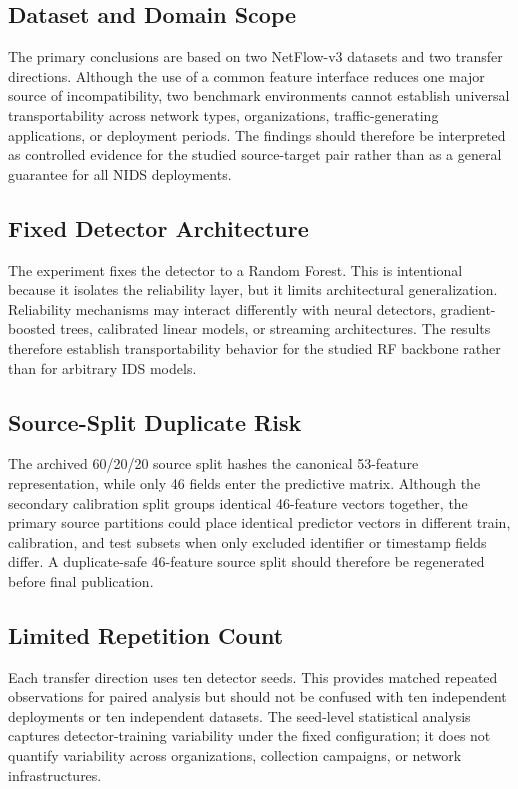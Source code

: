 \documentclass[conference]{IEEEtran}
\begin{document}
\subsection{Dataset and Domain Scope}

The primary conclusions are based on two NetFlow-v3 datasets and two transfer directions. Although the use of a common feature interface reduces one major source of incompatibility, two benchmark environments cannot establish universal transportability across network types, organizations, traffic-generating applications, or deployment periods. The findings should therefore be interpreted as controlled evidence for the studied source-target pair rather than as a general guarantee for all NIDS deployments.

\subsection{Fixed Detector Architecture}

The experiment fixes the detector to a Random Forest. This is intentional because it isolates the reliability layer, but it limits architectural generalization. Reliability mechanisms may interact differently with neural detectors, gradient-boosted trees, calibrated linear models, or streaming architectures. The results therefore establish transportability behavior for the studied RF backbone rather than for arbitrary IDS models.

\subsection{Source-Split Duplicate Risk}

The archived 60/20/20 source split hashes the canonical 53-feature representation, while only 46 fields enter the predictive matrix. Although the secondary calibration split groups identical 46-feature vectors together, the primary source partitions could place identical predictor vectors in different train, calibration, and test subsets when only excluded identifier or timestamp fields differ. A duplicate-safe 46-feature source split should therefore be regenerated before final publication.

\subsection{Limited Repetition Count}

Each transfer direction uses ten detector seeds. This provides matched repeated observations for paired analysis but should not be confused with ten independent deployments or ten independent datasets. The seed-level statistical analysis captures detector-training variability under the fixed configuration; it does not quantify variability across organizations, collection campaigns, or network infrastructures.
\end{document}
